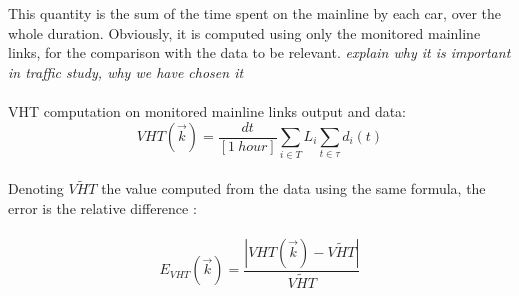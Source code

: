 This quantity is the sum of the time spent on the mainline by each car, over the whole duration.
Obviously, it is computed using only the monitored mainline links, for the comparison with the data to be relevant.
\emph{explain why it is important in traffic study, why we have chosen it}\\ 
\\
VHT computation on monitored mainline links output and data:
\begin{equation*}
	 VHT(\vec{k})=\frac{dt}{[1\ hour]}\sum_{i\in{T}}L_{i}\sum_{t\in \tau}d_{i}(t)
\end{equation*}
\\
Denoting $\widetilde{VHT}$ the value computed from the data using the same formula, the error is the relative difference :\\
\\
\begin{equation*}
	E_{VHT}(\vec{k})=\frac{|VHT(\vec{k})-\widetilde{VHT}|}{\widetilde{VHT}}
\end{equation*}
